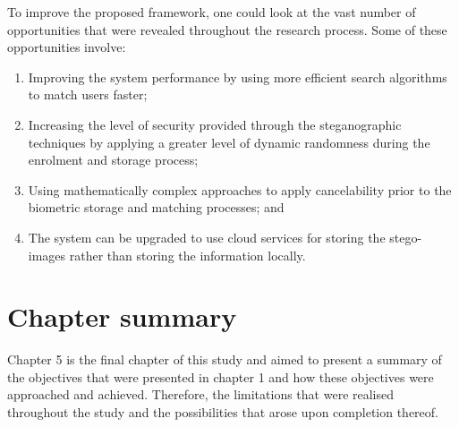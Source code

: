 To improve the proposed framework, one could look at the vast number of opportunities that were revealed throughout the research process. Some of these opportunities involve: 


\begin{enumerate}[label=\roman*.]
    \item Improving the system performance by using more efficient search algorithms to match users faster;
    \item Increasing the level of security provided through the steganographic techniques by applying a greater level of dynamic randomness during the enrolment and storage process; 
    \item Using mathematically complex approaches to apply cancelability prior to the biometric storage and matching processes; and
    \item The system can be upgraded to use cloud services for storing the stego-images rather than storing the information locally.
\end{enumerate}

\section{Chapter summary}

Chapter 5 is the final chapter of this study and aimed to present a summary of the objectives that were presented in chapter 1 and how these objectives were approached and achieved. Therefore, the limitations that were realised throughout the study and the possibilities that arose upon completion thereof.